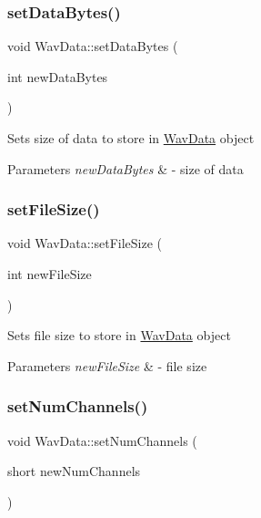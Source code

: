 \subsubsection{\texorpdfstring{set\+Data\+Bytes()}{setDataBytes()}}
{\footnotesize\ttfamily void Wav\+Data\+::set\+Data\+Bytes (\begin{DoxyParamCaption}\item[{int}]{new\+Data\+Bytes }\end{DoxyParamCaption})}

Sets size of data to store in \hyperlink{classWavData}{Wav\+Data} object 
\begin{DoxyParams}{Parameters}
{\em new\+Data\+Bytes} & -\/ size of data \\
\hline
\end{DoxyParams}
\mbox{\label{classWavData_ae8e224b695a9430f270acf813c0bd012}} 
\subsubsection{\texorpdfstring{set\+File\+Size()}{setFileSize()}}
{\footnotesize\ttfamily void Wav\+Data\+::set\+File\+Size (\begin{DoxyParamCaption}\item[{int}]{new\+File\+Size }\end{DoxyParamCaption})}

Sets file size to store in \hyperlink{classWavData}{Wav\+Data} object 
\begin{DoxyParams}{Parameters}
{\em new\+File\+Size} & -\/ file size \\
\hline
\end{DoxyParams}
\mbox{\label{classWavData_a04c2de91d9807f47b23147b9ad905964}} 
\subsubsection{\texorpdfstring{set\+Num\+Channels()}{setNumChannels()}}
{\footnotesize\ttfamily void Wav\+Data\+::set\+Num\+Channels (\begin{DoxyParamCaption}\item[{short}]{new\+Num\+Channels }\end{DoxyParamCaption})}

